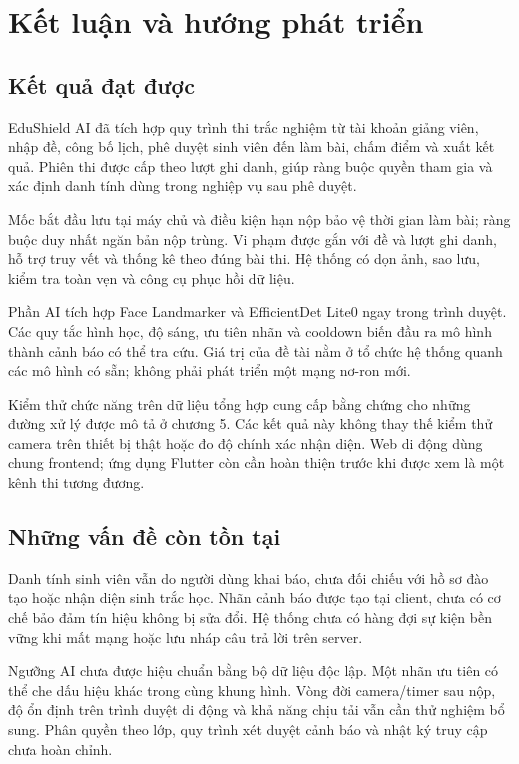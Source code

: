 \chapter{Kết luận và hướng phát triển}
\section{Kết quả đạt được}
EduShield AI đã tích hợp quy trình thi trắc nghiệm từ tài khoản giảng viên, nhập đề, công bố lịch, phê duyệt sinh viên đến làm bài, chấm điểm và xuất kết quả. Phiên thi được cấp theo lượt ghi danh, giúp ràng buộc quyền tham gia và xác định danh tính dùng trong nghiệp vụ sau phê duyệt.

Mốc bắt đầu lưu tại máy chủ và điều kiện hạn nộp bảo vệ thời gian làm bài; ràng buộc duy nhất ngăn bản nộp trùng. Vi phạm được gắn với đề và lượt ghi danh, hỗ trợ truy vết và thống kê theo đúng bài thi. Hệ thống có dọn ảnh, sao lưu, kiểm tra toàn vẹn và công cụ phục hồi dữ liệu.

Phần AI tích hợp Face Landmarker và EfficientDet Lite0 ngay trong trình duyệt. Các quy tắc hình học, độ sáng, ưu tiên nhãn và cooldown biến đầu ra mô hình thành cảnh báo có thể tra cứu. Giá trị của đề tài nằm ở tổ chức hệ thống quanh các mô hình có sẵn; không phải phát triển một mạng nơ-ron mới.

Kiểm thử chức năng trên dữ liệu tổng hợp cung cấp bằng chứng cho những đường xử lý được mô tả ở chương 5. Các kết quả này không thay thế kiểm thử camera trên thiết bị thật hoặc đo độ chính xác nhận diện. Web di động dùng chung frontend; ứng dụng Flutter còn cần hoàn thiện trước khi được xem là một kênh thi tương đương.

\section{Những vấn đề còn tồn tại}
Danh tính sinh viên vẫn do người dùng khai báo, chưa đối chiếu với hồ sơ đào tạo hoặc nhận diện sinh trắc học. Nhãn cảnh báo được tạo tại client, chưa có cơ chế bảo đảm tín hiệu không bị sửa đổi. Hệ thống chưa có hàng đợi sự kiện bền vững khi mất mạng hoặc lưu nháp câu trả lời trên server.

Ngưỡng AI chưa được hiệu chuẩn bằng bộ dữ liệu độc lập. Một nhãn ưu tiên có thể che dấu hiệu khác trong cùng khung hình. Vòng đời camera/timer sau nộp, độ ổn định trên trình duyệt di động và khả năng chịu tải vẫn cần thử nghiệm bổ sung. Phân quyền theo lớp, quy trình xét duyệt cảnh báo và nhật ký truy cập chưa hoàn chỉnh.

